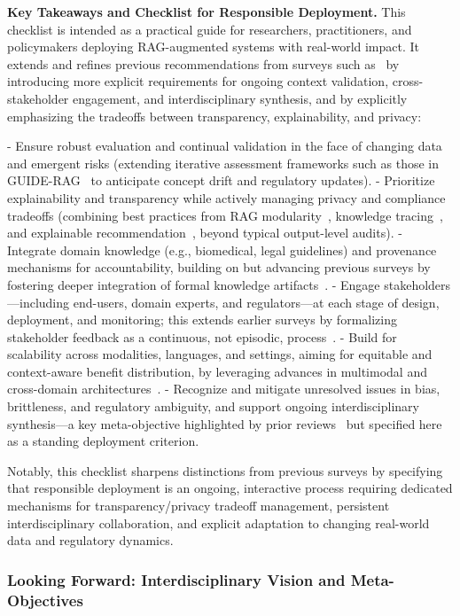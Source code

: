 \documentclass[sigconf]{acmart}
\begin{document}
\vspace{2mm}
\noindent
\textbf{Key Takeaways and Checklist for Responsible Deployment.}
This checklist is intended as a practical guide for researchers, practitioners, and policymakers deploying RAG-augmented systems with real-world impact. It extends and refines previous recommendations from surveys such as~\cite{ref5,ref8,ref34} by introducing more explicit requirements for ongoing context validation, cross-stakeholder engagement, and interdisciplinary synthesis, and by explicitly emphasizing the tradeoffs between transparency, explainability, and privacy:

- Ensure robust evaluation and continual validation in the face of changing data and emergent risks (extending iterative assessment frameworks such as those in GUIDE-RAG~\cite{ref5} to anticipate concept drift and regulatory updates).
- Prioritize explainability and transparency while actively managing privacy and compliance tradeoffs (combining best practices from RAG modularity~\cite{ref8}, knowledge tracing~\cite{ref36}, and explainable recommendation~\cite{ref34}, beyond typical output-level audits).
- Integrate domain knowledge (e.g., biomedical, legal guidelines) and provenance mechanisms for accountability, building on but advancing previous surveys by fostering deeper integration of formal knowledge artifacts~\cite{ref1,ref13}.
- Engage stakeholders—including end-users, domain experts, and regulators—at each stage of design, deployment, and monitoring; this extends earlier surveys by formalizing stakeholder feedback as a continuous, not episodic, process~\cite{ref5,ref50}.
- Build for scalability across modalities, languages, and settings, aiming for equitable and context-aware benefit distribution, by leveraging advances in multimodal and cross-domain architectures~\cite{ref12,ref19}.
- Recognize and mitigate unresolved issues in bias, brittleness, and regulatory ambiguity, and support ongoing interdisciplinary synthesis—a key meta-objective highlighted by prior reviews~\cite{ref4} but specified here as a standing deployment criterion.

Notably, this checklist sharpens distinctions from previous surveys by specifying that responsible deployment is an ongoing, interactive process requiring dedicated mechanisms for transparency/privacy tradeoff management, persistent interdisciplinary collaboration, and explicit adaptation to changing real-world data and regulatory dynamics.

\subsubsection{Looking Forward: Interdisciplinary Vision and Meta-Objectives}
\end{document}
